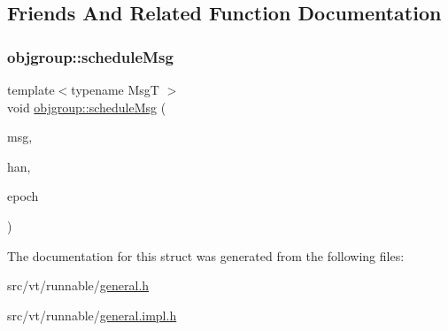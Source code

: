 \subsection{Friends And Related Function Documentation}
\mbox{\label{structvt_1_1runnable_1_1_runnable_abbe5d6061278e82454f36a2c0535d066}} 
\subsubsection{\texorpdfstring{objgroup\+::schedule\+Msg}{objgroup::scheduleMsg}}
{\footnotesize\ttfamily template$<$typename MsgT $>$ \\
void \hyperlink{namespacevt_1_1objgroup_ab154142df9cf5401462e1b4cabb3b480}{objgroup\+::schedule\+Msg} (\begin{DoxyParamCaption}\item[{\hyperlink{namespacevt_ab2b3d506ec8e8d1540aede826d84a239}{Msg\+Shared\+Ptr}$<$ \hyperlink{namespacevt_a1125ac1da6c0bbf141e0ea0739d7602d}{Short\+Message} $>$}]{msg,  }\item[{\hyperlink{namespacevt_af64846b57dfcaf104da3ef6967917573}{Handler\+Type}}]{han,  }\item[{\hyperlink{namespacevt_a985a5adf291c34a3ca263b3378388236}{Epoch\+Type}}]{epoch }\end{DoxyParamCaption})\hspace{0.3cm}{\ttfamily [friend]}}



The documentation for this struct was generated from the following files\+:\begin{DoxyCompactItemize}
\item 
src/vt/runnable/\hyperlink{general_8h}{general.\+h}\item 
src/vt/runnable/\hyperlink{general_8impl_8h}{general.\+impl.\+h}\end{DoxyCompactItemize}
